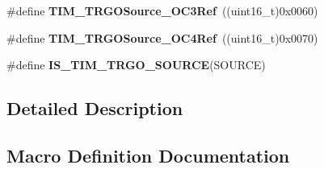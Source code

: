 \begin{DoxyCompactItemize}
\item 
\hypertarget{group___t_i_m___trigger___output___source_ga40943bc1c3f22b983c683cbf0e87a218}{}\#define {\bfseries T\+I\+M\+\_\+\+T\+R\+G\+O\+Source\+\_\+\+O\+C3\+Ref}~((uint16\+\_\+t)0x0060)\label{group___t_i_m___trigger___output___source_ga40943bc1c3f22b983c683cbf0e87a218}

\item 
\hypertarget{group___t_i_m___trigger___output___source_gafc81561599199912d613c65f760919bc}{}\#define {\bfseries T\+I\+M\+\_\+\+T\+R\+G\+O\+Source\+\_\+\+O\+C4\+Ref}~((uint16\+\_\+t)0x0070)\label{group___t_i_m___trigger___output___source_gafc81561599199912d613c65f760919bc}

\item 
\#define {\bfseries I\+S\+\_\+\+T\+I\+M\+\_\+\+T\+R\+G\+O\+\_\+\+S\+O\+U\+R\+C\+E}(S\+O\+U\+R\+C\+E)
\end{DoxyCompactItemize}


\subsection{Detailed Description}


\subsection{Macro Definition Documentation}
\hypertarget{group___t_i_m___trigger___output___source_gadf4e4e0422bd9c108b184884781d2d46}{}
